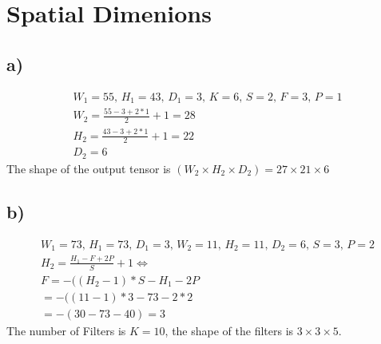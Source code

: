 \documentclass[]{article}
\begin{document}
\section{Spatial Dimenions}
\subsection*{a)}
\begin{align*}
W_1 = 55,\, H_1 = 43,\, D_1 = 3,\, K = 6,\, S = 2,\, F  = 3,\, P = 1 \\
W_2 = \frac{55 - 3 + 2*1}{2} + 1 = 28 \\
H_2 = \frac{43 - 3 + 2*1}{2} + 1 = 22 \\
D_2 = 6
\end{align*}
The shape of the output tensor is $(W_2 \times H_2 \times D_2) = 27 \times 21 \times 6$

\subsection*{b)}
\begin{align*}
W_1 = 73,\, H_1 = 73,\, D_1 =3 ,\, W_2 = 11,\, H_2 = 11,\, D_2 = 6,\, S = 3,\,P = 2\\
H_2 = \frac{H_1 - F + 2P}{S} + 1 \Leftrightarrow \\
F = -((H_2 - 1) * S - H_1 - 2P \\
= -((11 - 1) * 3 - 73 - 2*2 \\
= -(30 - 73 - 40) = 3
\end{align*}
The number of Filters is $K = 10$, the shape of the filters is $3 \times 3 \times 5$.
\end{document}
